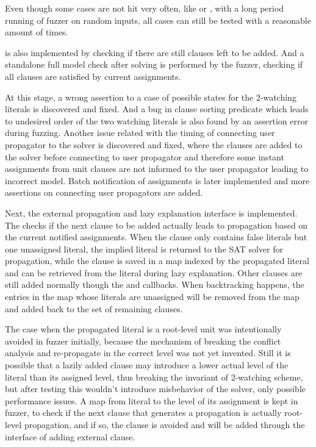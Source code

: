 Even though some cases are not hit very often, like  or , with a long period running of fuzzer on random inputs, all cases can still be tested with a reasonable amount of times.

 is also implemented by checking if there are still clauses left to be added. And a standalone full model check after solving is performed by the fuzzer, checking if all clauses are satisfied by current assignments.

At this stage, a wrong assertion to a case of possible states for the 2-watching literals is discovered and fixed. And a bug in clause sorting predicate which leads to undesired order of the two watching literals is also found by an assertion error during fuzzing. Another issue related with the timing of connecting user propagator to the solver is discovered and fixed, where the clauses are added to the solver before connecting to user propagator and therefore some instant assignments from unit clauses are not informed to the user propagator leading to incorrect model. Batch notification of assignments is later implemented and more assertions on connecting user propagators are added.

Next, the external propagation and lazy explanation interface is implemented. The  checks if the next clause to be added actually leads to propagation based on the current notified assignments. When the clause only contains false literals but one unassigned literal, the implied literal is returned to the SAT solver for propagation, while the clause is saved in a map indexed by the propagated literal and can be retrieved from the literal during lazy explanation. Other clauses are still added normally though the  and  callbacks. When backtracking happens, the entries in the map whose literals are unassigned will be removed from the map and added back to the set of remaining clauses.

The case when the propagated literal is a root-level unit was intentionally avoided in fuzzer initially, because the mechanism of breaking the conflict analysis and re-propagate in the correct level was not yet invented. Still it is possible that a lazily added clause may introduce a lower actual level of the literal than its assigned level, thus breaking the invariant of 2-watching scheme, but after testing this wouldn't introduce misbehavior of the solver, only possible performance issues. A map from literal to the level of its assignment is kept in fuzzer, to check if the next clause that generates a propagation is actually root-level propagation, and if so, the clause is avoided and will be added through the interface of adding external clause.

